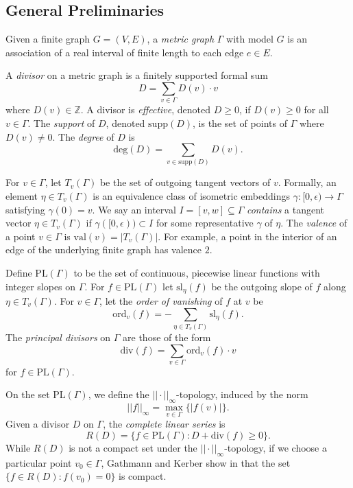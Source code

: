 \documentclass{amsart}
\begin{document}
	\subsection{General Preliminaries}
	\label{Subsec:General-Prelim}
	
	Given a finite graph $G = (V,E)$, a \textit{metric graph} $\Gamma$ with model $G$ is an association of a real interval of finite length to each edge $e \in E$.
	
	A \textit{divisor} on a metric graph is a finitely supported formal sum $$D = \sum_{v \in \Gamma} D(v) \cdot v$$ where $D(v) \in \mathbb{Z}$. A divisor is \textit{effective}, denoted $D \geq 0$, if $D(v) \geq 0$ for all $v \in \Gamma$. The \textit{support} of $D$, denoted $\mathrm{supp}(D)$, is the set of points of $\Gamma$ where $D(v) \neq 0$. The \textit{degree} of $D$ is $$\mathrm{deg}(D) = \sum_{v \in \mathrm{supp}(D)} D(v).$$
	
	For $v \in \Gamma$, let $T_v(\Gamma)$ be the set of outgoing tangent vectors of $v$. Formally, an element $\eta \in T_v(\Gamma)$ is an equivalence class of isometric embeddings $\gamma: [0,\epsilon) \to \Gamma$ satisfying $\gamma(0) = v$. We say an interval $I = [v,w] \subseteq \Gamma$ \textit{contains} a tangent vector $\eta \in T_v(\Gamma)$ if $\gamma([0,\epsilon)) \subset I$ for some representative $\gamma$ of $\eta$. The \textit{valence} of a point $v \in \Gamma$ is $\mathrm{val}(v) = |T_v(\Gamma)|$. For example, a point in the interior of an edge of the underlying finite graph has valence $2$.
	
	Define $\mathrm{PL}(\Gamma)$ to be the set of continuous, piecewise linear functions with integer slopes on $\Gamma$. For $f \in \mathrm{PL}(\Gamma)$ let $\mathrm{sl}_{\eta}(f)$ be the outgoing slope of $f$ along $\eta \in T_v(\Gamma)$. For $v \in \Gamma$, let the \textit{order of vanishing} of $f$ at $v$ be $$\mathrm{ord}_v(f) = - \sum_{\eta \in T_v(\Gamma)} \mathrm{sl}_{\eta}(f).$$ The \textit{principal divisors} on $\Gamma$ are those of the form $$\mathrm{div}(f) = \sum_{v \in \Gamma} \mathrm{ord}_v(f) \cdot v$$ for $f \in \mathrm{PL}(\Gamma)$.
	
	On the set $\mathrm{PL}(\Gamma)$, we define the $||\cdot||_{\infty}$-topology, induced by the norm $$||f||_{\infty} = \max_{v \in \Gamma } \{ |f(v)| \}.$$ Given a divisor $D$ on $\Gamma$, the \textit{complete linear series} is $$R(D) = \{ f \in \mathrm{PL}(\Gamma) : D + \mathrm{div}(f) \geq 0 \}.$$ While $R(D)$ is not a compact set under the $||\cdot||_{\infty}$-topology, if we choose a particular point $v_0 \in \Gamma$, Gathmann and Kerber show in \cite{gathmann2008riemann} that the set $\{ f \in R(D) : f(v_0) = 0 \}$ is compact.
	
\end{document}
